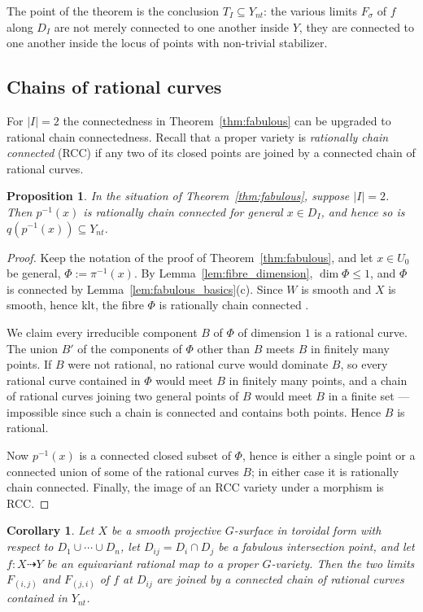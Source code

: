 \documentclass[11pt]{amsart}
\theoremstyle{plain}
\newtheorem{proposition}[theorem]{Proposition}
\newtheorem{corollary}[theorem]{Corollary}
\theoremstyle{definition}
\theoremstyle{remark}
\numberwithin{equation}{section}
\begin{document}
The point of the theorem is the conclusion $T_I \subseteq Y_{nt}$: the
various limits $F_\sigma$ of $f$ along $D_I$ are not merely connected to
one another inside $Y$, they are connected to one another inside the locus
of points with non-trivial stabilizer.

\subsection*{Chains of rational curves}

For $|I| = 2$ the connectedness in Theorem~\ref{thm:fabulous} can be
upgraded to rational chain connectedness.  Recall that a proper variety is
\emph{rationally chain connected} (RCC) if any two of its closed points are
joined by a connected chain of rational curves.

\begin{proposition} \label{prop:rcc}
In the situation of Theorem~\ref{thm:fabulous}, suppose $|I| = 2$.  Then
$p^{-1}(x)$ is rationally chain connected for general $x \in D_I$, and
hence so is $q(p^{-1}(x)) \subseteq Y_{nt}$.
\end{proposition}

\begin{proof}
Keep the notation of the proof of Theorem~\ref{thm:fabulous}, and let $x
\in U_0$ be general, $\Phi := \pi^{-1}(x)$.  By
Lemma~\ref{lem:fibre_dimension}, $\dim \Phi \leq 1$, and $\Phi$ is
connected by Lemma~\ref{lem:fabulous_basics}(c).  Since $W$ is smooth and
$X$ is smooth, hence klt, the fibre $\Phi$ is rationally chain connected
\cite{HaconMcKernan}.

We claim every irreducible component $B$ of $\Phi$ of dimension $1$ is a
rational curve.  The union $B'$ of the components of $\Phi$ other than $B$
meets $B$ in finitely many points.  If $B$ were not rational, no rational
curve would dominate $B$, so every rational curve contained in $\Phi$ would
meet $B$ in finitely many points, and a chain of rational curves joining
two general points of $B$ would meet $B$ in a finite set --- impossible
since such a chain is connected and contains both points.  Hence $B$ is
rational.

Now $p^{-1}(x)$ is a connected closed subset of $\Phi$, hence is either a
single point or a connected union of some of the rational curves $B$; in
either case it is rationally chain connected.  Finally, the image of an RCC
variety under a morphism is RCC.
\end{proof}

\begin{corollary}
Let $X$ be a smooth projective $G$-surface in toroidal form with respect to
$D_1 \cup \cdots \cup D_n$, let $D_{ij} = D_i \cap D_j$ be a fabulous
intersection point, and let $f : X \dasharrow Y$ be an equivariant rational
map to a proper $G$-variety.  Then the two limits $F_{(i,j)}$ and
$F_{(j,i)}$ of $f$ at $D_{ij}$ are joined by a connected chain of rational
curves contained in $Y_{nt}$.
\end{corollary}
\end{document}
